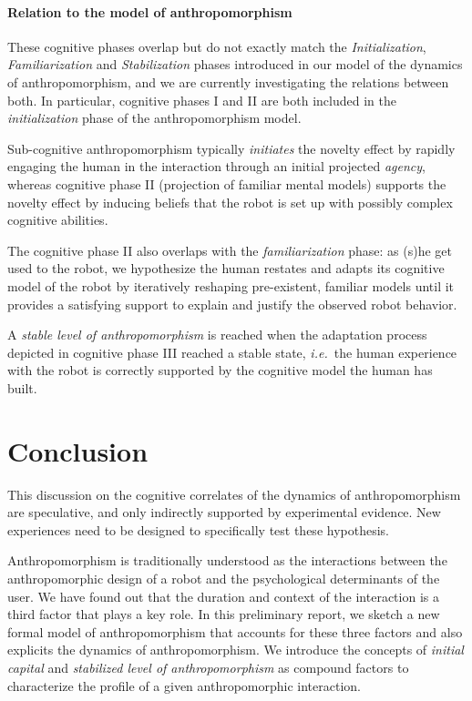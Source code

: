 \documentclass{sig-alternate-2013}
\newcommand{\ie}{{\textit{i.e.~}}}
\begin{document}
\paragraph{Relation to the model of anthropomorphism} 

These cognitive phases overlap but do not exactly match the
\emph{Initialization}, \emph{Familiarization} and \emph{Stabilization} phases
introduced in our model of the dynamics of anthropomorphism, and we are currently
investigating the relations between both. In particular, cognitive phases I and
II are both included in the \emph{initialization} phase of the anthropomorphism
model.

Sub-cognitive anthropomorphism typically \emph{initiates} the novelty effect by
rapidly engaging the human in the interaction through an initial projected
\emph{agency}, whereas cognitive phase II (projection of familiar mental
models) supports the novelty effect by inducing beliefs that the robot is set
up with possibly complex cognitive abilities.

The cognitive phase II also overlaps with the \emph{familiarization} phase: as
(s)he get used to the robot, we hypothesize the human restates and adapts its
cognitive model of the robot by iteratively reshaping pre-existent, familiar
models until it provides a satisfying support to explain and justify the
observed robot behavior.

A \emph{stable level of anthropomorphism} is reached when the adaptation
process depicted in cognitive phase III reached a stable state, \ie the human
experience with the robot is correctly supported by the cognitive model the
human has built.

\section{Conclusion}
\label{sec:conclusion}

This discussion on the cognitive correlates of the dynamics
of anthropomorphism are speculative, and only indirectly supported by
experimental evidence. New experiences need to be designed to specifically test
these hypothesis.


Anthropomorphism is traditionally understood as the interactions between the
anthropomorphic design of a robot and the psychological determinants of the
user. We have found out that the duration and context of the interaction is a
third factor that plays a key role. In this preliminary report, we sketch a new
formal model of anthropomorphism that accounts for these three factors and also
explicits the dynamics of anthropomorphism. We introduce the concepts of
\emph{initial capital} and \emph{stabilized level of anthropomorphism} as
compound factors to characterize the profile of a given anthropomorphic
interaction.
\end{document}
